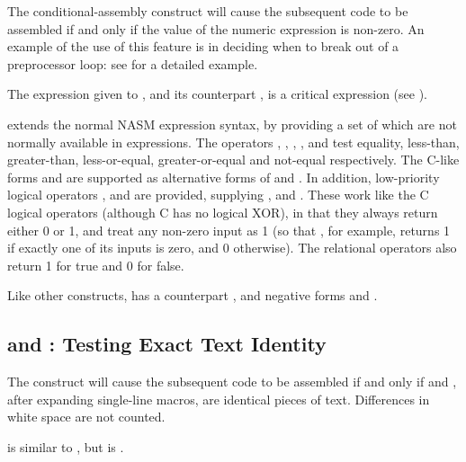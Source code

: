 The conditional-assembly construct  will cause the
subsequent code to be assembled if and only if the value of the
numeric expression  is non-zero. An example of the use of
this feature is in deciding when to break out of a 
preprocessor loop: see  for a detailed example.

The expression given to , and its counterpart
, is a critical expression (see ).

 extends the normal NASM expression syntax, by providing a
set of  which are not normally available in
expressions. The operators \codeindex{=}, \codeindex{\textless},
\codeindex{\textgreater}, \codeindex{\textless=}, \codeindex{\textgreater=}
and \codeindex{\textless\textgreater} test equality,
less-than, greater-than, less-or-equal, greater-or-equal and not-equal
respectively. The C-like forms \codeindex{==} and \codeindex{!=} are
supported as alternative forms of \code{=} and \code{\textless\textgreater}.
In addition, low-priority logical operators \codeindex{\&\&},
\codeindex{\^{}\^{}} and \codeindex{||} are provided, supplying
,  and .
These work like the C logical operators (although C has no logical XOR),
in that they always return either 0 or 1, and treat any non-zero input as 1
(so that \code{\^{}\^{}}, for example, returns 1 if exactly one of its inputs
is zero, and 0 otherwise). The relational operators also return 1
for true and 0 for false.

Like other  constructs,  has a counterpart
, and negative forms  and .

\subsection{ and : Testing Exact Text Identity}
\label{subsec:ifidn}

The construct  will cause the subsequent code
to be assembled if and only if  and , after
expanding single-line macros, are identical pieces of text.
Differences in white space are not counted.

 is similar to , but is .

